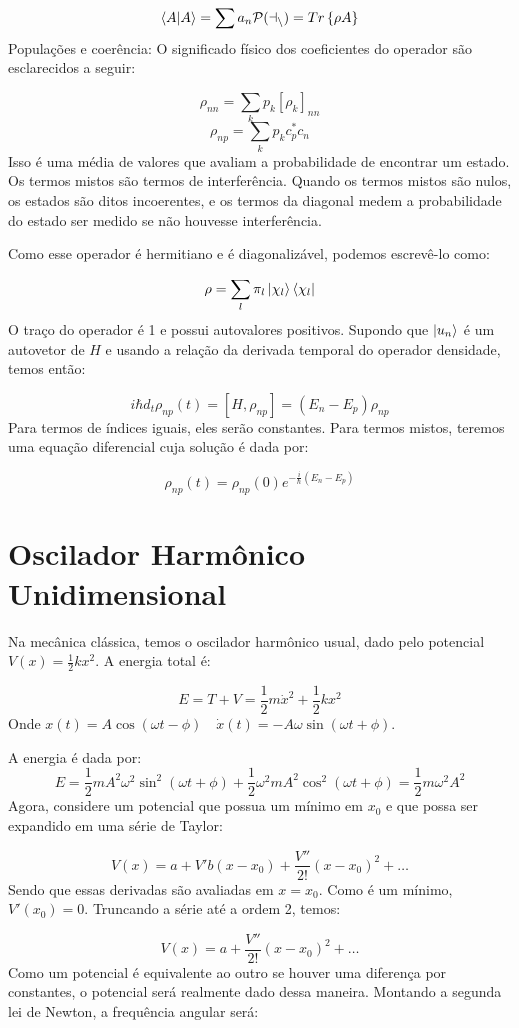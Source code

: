 \documentclass{article}
\begin{document}
	$$\braket{  A  } =\sum a_{n}\mathcal{P(a_{n})}=Tr\left\{ \rho A \right\}  $$
	Populações e coerência: O significado físico dos coeficientes do operador são esclarecidos a seguir:
	
	$$\rho_{nn}=\sum_{k}p_{k}[\rho_{k}]_{nn}$$
	$$\rho_{np}=\sum_{k}p_{k}c^{*}_{p}c_{n} $$
	Isso é uma média de valores que avaliam a probabilidade de encontrar um estado. Os termos mistos são termos de interferência. Quando os termos mistos são nulos, os estados são ditos incoerentes, e os termos da diagonal medem a probabilidade do estado ser medido se não houvesse interferência.
	
	Como esse operador é hermitiano e é diagonalizável, podemos escrevê-lo como:
	
	$$\rho=\sum_{l}\pi_{l}\ket{\chi_{l}} \bra{\chi_{l}} $$
	O traço do operador é 1 e possui autovalores positivos. Supondo que $\ket{u_{n}}$ é um autovetor de $H$ e usando a relação da derivada temporal do operador densidade, temos então:
	
	$$i\hbar d_{t} \rho_{np}(t)=\left[ H,\rho_{np} \right]=(E_{n}-E_{p})\rho_{np}$$
	Para termos de índices iguais, eles serão constantes. Para termos mistos, teremos uma equação diferencial cuja solução é dada por:
	
	$$\rho_{np}(t)=\rho_{np}(0)e^{-\frac{i}{\hbar}\left( E_{n}-E_{p} \right) }$$
	
	\section{Oscilador Harmônico Unidimensional}
	
	Na mecânica clássica, temos o oscilador harmônico usual, dado pelo potencial $V(x)=\frac{1}{2}kx^{2}$.
	A energia total é:
	
	$$E=T+V=\frac{1}{2}m\dot{x}^{2}+\frac{1}{2}kx^{2}$$
	Onde $x(t)=A\cos(\omega t-\phi)\quad \dot{x}(t)=-A\omega \sin(\omega t+\phi)$.
	
	A energia é dada por: $$E=\frac{1}{2}mA^{2}\omega^{2}\sin ^{2}(\omega t +\phi)+\frac{1}{2}\omega^{2}mA^{2}\cos ^{2}(\omega t+\phi)=\frac{1}{2}m\omega^{2}A^{2}$$
	Agora, considere um potencial que possua um mínimo em $x_{0}$ e que possa ser expandido em uma série de Taylor:
	
	$$V(x)=a+V'b(x-x_{0})+\frac{V''}{2!}(x-x_{0})^{2}+\dots$$
	Sendo que essas derivadas são avaliadas em $x=x_{0}$. Como é um mínimo, $V'(x_{0})=0$.
	Truncando a série até a ordem 2, temos:
	
	$$V(x)=a+\frac{V''}{2!}(x-x_{0})^{2}+\dots$$
	Como um potencial é equivalente ao outro se houver uma diferença por constantes, o potencial será realmente dado dessa maneira.
	Montando a segunda lei de Newton, a frequência angular será:
	
\end{document}
